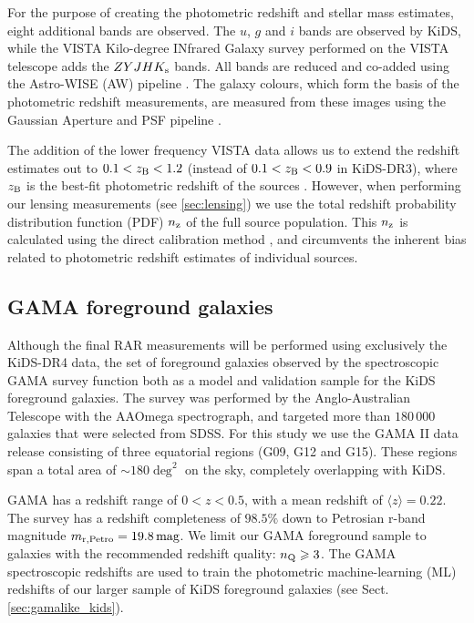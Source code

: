 \documentclass[usenatbib]{mnras}
\newcommand{\magn}{\, {\rm mag} }
\newcommand*{\meanb}[1]{\langle{#1}\rangle}
\newcommand{\un}[1]{_{\rm #1}}
\begin{document}
For the purpose of creating the photometric redshift and stellar mass estimates, eight additional bands are observed. The $u$, $g$ and $i$ bands are observed by KiDS, while the VISTA Kilo-degree INfrared Galaxy survey \cite[VIKING,][]{edge2013} performed on the VISTA telescope adds the $ZYJHK_{\rm s}$ bands. All bands are reduced and co-added using the Astro-WISE (AW) pipeline \cite[]{mcfarland2013}. The galaxy colours, which form the basis of the photometric redshift measurements, are measured from these images using the Gaussian Aperture and PSF pipeline \cite[GAaP][]{kuijken2008,kuijken2015}.

The addition of the lower frequency VISTA data allows us to extend the redshift estimates out to $0.1<z\un{B}<1.2$ (instead of $0.1<z\un{B}<0.9$ in KiDS-DR3), where $z\un{B}$ is the best-fit photometric redshift of the sources \cite[]{benitez2000,hildebrandt2012}. However, when performing our lensing measurements (see \ref{sec:lensing}) we use the total redshift probability distribution function (PDF) $n\un{z}$ of the full source population. This $n\un{z}$ is calculated using the direct calibration method \cite[DIR,][]{hildebrandt2017}, and circumvents the inherent bias related to photometric redshift estimates of individual sources.

\subsection{GAMA foreground galaxies}
\label{sec:gama}

Although the final RAR measurements will be performed using exclusively the KiDS-DR4 data, the set of foreground galaxies observed by the spectroscopic GAMA survey \cite[]{driver2011} function both as a model and validation sample for the KiDS foreground galaxies. The survey was performed by the Anglo-Australian Telescope with the AAOmega spectrograph, and targeted more than $180 \, 000$ galaxies that were selected from SDSS. For this study we use the GAMA II data release \cite[]{liske2015} consisting of three equatorial regions (G09, G12 and G15). These regions span a total area of $\sim180 \deg^2$ on the sky, completely overlapping with KiDS.

GAMA has a redshift range of $0<z<0.5$, with a mean redshift of $\meanb{z}=0.22$. The survey has a redshift completeness of $98.5\%$ down to Petrosian r-band magnitude $m\un{r,Petro} = 19.8 \magn$. We limit our GAMA foreground sample to galaxies with the recommended redshift quality: $n\un{Q}\geq3$. The GAMA spectroscopic redshifts are used to train the photometric machine-learning (ML) redshifts of our larger sample of KiDS foreground galaxies (see Sect. \ref{sec:gamalike_kids}).
\end{document}
